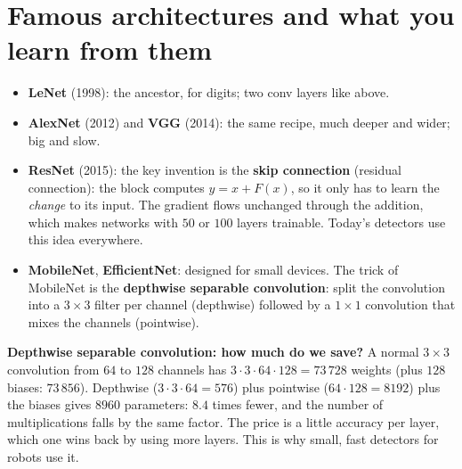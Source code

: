\section*{Famous architectures and what you learn from them}
\begin{itemize}[nosep]
\item \textbf{LeNet} (1998): the ancestor, for digits; two conv layers like above.
\item \textbf{AlexNet} (2012) and \textbf{VGG} (2014): the same recipe, much deeper and wider; big and slow.
\item \textbf{ResNet} (2015): the key invention is the \textbf{skip connection} (residual connection): the block computes $y=x+F(x)$, so it only has to learn the \emph{change} to its input. The gradient flows unchanged through the addition, which makes networks with $50$ or $100$ layers trainable. Today's detectors use this idea everywhere.
\item \textbf{MobileNet}, \textbf{EfficientNet}: designed for small devices. The trick of MobileNet is the \textbf{depthwise separable convolution}: split the convolution into a $3\times3$ filter per channel (depthwise) followed by a $1\times1$ convolution that mixes the channels (pointwise).
\end{itemize}
\begin{center}
\end{center}
\begin{example}
\textbf{Depthwise separable convolution: how much do we save?} A normal $3\times3$ convolution from $64$ to $128$ channels has $3\cdot3\cdot64\cdot128=73\,728$ weights (plus $128$ biases: $73\,856$). Depthwise ($3\cdot3\cdot64=576$) plus pointwise ($64\cdot128=8192$) plus the biases gives $8960$ parameters: $8.4$ times fewer, and the number of multiplications falls by the same factor. The price is a little accuracy per layer, which one wins back by using more layers. This is why small, fast detectors for robots use it.
\end{example}
